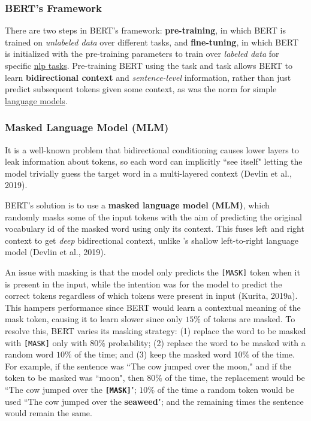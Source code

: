 \subsubsection{BERT's Framework}
 
There are two steps in BERT's framework: \textbf{pre-training}, in which BERT is trained on \emph{unlabeled data} over different tasks, and \textbf{fine-tuning}, in which BERT is initialized with the pre-training parameters to train over \emph{labeled data} for specific \hyperref[app:Appendix_NLPTasks]{nlp tasks}. Pre-training BERT using the  task and  task allows BERT to learn \textbf{bidirectional context} and \emph{sentence-level} information, rather than just predict subsequent tokens given some context, as was the norm for simple \hyperref[sec:LanguageModels]{language models}.


\subsubsection{Masked Language Model (MLM)} \label{sec:maskedlanguagemodelMLM}

It is a well-known problem that bidirectional conditioning causes lower layers to leak information about tokens, so each word can implicitly ``see itself" letting the model trivially guess the target word in a multi-layered context (Devlin et al., 2019).  

BERT's solution is to use a \textbf{masked language model (MLM)}, which randomly masks some of the input tokens with the aim of predicting the original vocabulary id of the masked word using only its context. This fuses left and right context to get \emph{deep} bidirectional context, unlike 's shallow left-to-right language model (Devlin et al., 2019).  

An issue with masking is that the model only predicts the \texttt{[MASK]} token when it is present in the input, while the intention was for the model to predict the correct tokens regardless of which tokens were present in input (Kurita, 2019a). This hampers performance since BERT would learn a contextual meaning of the mask token, causing it to learn slower since only $15 \%$ of tokens are masked. To resolve this, BERT varies its masking strategy: (1) replace the word to be masked with \texttt{[MASK]} only with $80\%$ probability; (2) replace the word to be masked with a random word $10 \%$ of the time; and (3) keep the masked word $10 \%$ of the time. For example, if the sentence was ``The cow jumped over the moon," and if the token to be masked was ``moon", then $80 \%$ of the time, the replacement would be ``The cow jumped over the \textbf{\texttt{[MASK]}}"; $10 \%$ of the time a random token would be used ``The cow jumped over the \textbf{seaweed}"; and the remaining times the sentence would remain the same. 




